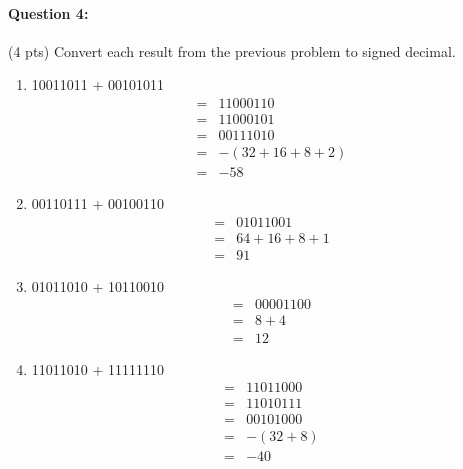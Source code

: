 \documentclass[12pt,letterpaper,titlepage]{report}
\begin{document}
\begin{raggedright}
\paragraph{Question 4:}
(4 pts) Convert each result from the previous problem to signed decimal. 
\begin{multicols}{2}
\begin{enumerate} [label=\alph*)]
\item 10011011 + 00101011
\begin{align*}
  =& 11000110
\\=& 11000101
\\=& 00111010
\\=& -(32+16+8+2)
\\=& -58
\end{align*}
\item 00110111 + 00100110
\begin{align*}
  =& 01011001
\\=& 64+16+8+1
\\=& 91
\end{align*}
\item 01011010 + 10110010
\begin{align*}
  =& 00001100
\\=& 8+4
\\=& 12
\end{align*}
\item 11011010 + 11111110 
\begin{align*}
  =& 11011000
\\=& 11010111
\\=& 00101000
\\=& -(32+8)
\\=& -40
\end{align*}
\end{enumerate}
\end{multicols}
\clearpage


\end{raggedright}
\end{document}
